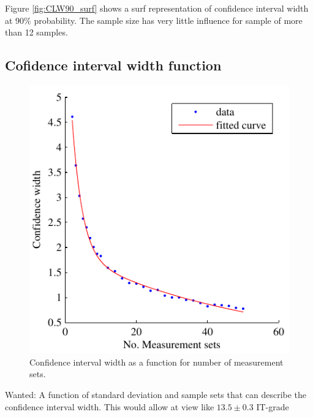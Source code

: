 \documentclass[aip,amsmath, reprint, author-year,nobalancelastpage]{revtex4-1}
\begin{document}
Figure \ref{fig:CLW90_surf} shows a surf representation of confidence interval width at $ 90 \%$ probability. The sample size has very little influence for sample of more than 12 samples. 

\newpage

\subsection{Cofidence interval width function}
\begin{figure}[H]
\includegraphics{regresion_sample_sets.pdf}
\caption{\label{fig:reg_sample} Confidence interval width as a function for number of measurement sets.   }
\end{figure}

Wanted:  
A function of standard deviation and sample sets that can describe the confidence interval width. This would allow at view like $ 13.5  \pm 0.3$ IT-grade

\newpage
\end{document}
